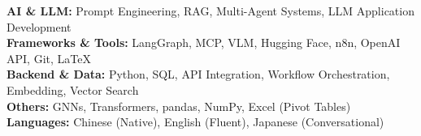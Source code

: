 \documentclass[11pt]{article}
\begin{document}
\textbf{AI \& LLM:} Prompt Engineering, RAG, Multi-Agent Systems, LLM Application Development \\
\textbf{Frameworks \& Tools:} LangGraph, MCP, VLM, Hugging Face, n8n, OpenAI API, Git, LaTeX \\
\textbf{Backend \& Data:} Python, SQL, API Integration, Workflow Orchestration, Embedding, Vector Search \\
\textbf{Others:} GNNs, Transformers, pandas, NumPy, Excel (Pivot Tables) \\
\textbf{Languages:} Chinese (Native), English (Fluent), Japanese (Conversational)
\end{document}
